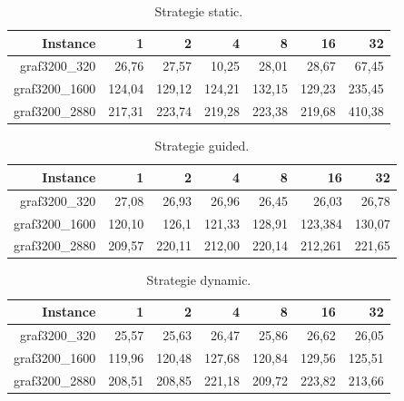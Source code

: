 \documentclass[a4paper,11pt]{article}
\begin{document}
\begin{table}[H]
  \begin{center}
      \begin{tabular}{|r|r|r|r|r|r|r|}
      \hline
      
      Instance  	& 1	    & 2		& 4	& 8	& 16 	& 32	   \\ \hline
      graf3200\_320	& 26,76 & 27,57 & 10,25	&28,01 	&28,67 	&67,45 \\ \hline
      graf3200\_1600	& 124,04 & 129,12 & 124,21 & 132,15 & 129,23 &235,45 \\ \hline
       graf3200\_2880	& 217,31 & 223,74 & 219,28 & 223,38 & 219,68 & 410,38 \\ \hline

      \end{tabular}
  \caption{Strategie static.}
  \label{tab:static}
  \end{center}
\end{table}

\begin{table}[H]
  \begin{center}
      \begin{tabular}{|r|r|r|r|r|r|r|}
      \hline
      
      Instance  	& 1	    & 2		& 4	& 8	& 16 	& 32	   \\ \hline
      graf3200\_320	& 27,08 & 26,93 & 26,96 & 26,45 & 26,03 & 26,78 \\ \hline
      graf3200\_1600	& 120,10 & 126,1 & 121,33 & 128,91 & 123,384 & 130,07 \\ \hline
      graf3200\_2880	& 209,57 & 220,11 & 212,00 & 220,14 & 212,261 & 221,65 \\ \hline
      
      \end{tabular}
  \caption{Strategie guided.}
  \label{tab:guided}
  \end{center}
\end{table}

\begin{table}[H]
  \begin{center}
      \begin{tabular}{|r|r|r|r|r|r|r|}
      \hline
      
      Instance  	& 1	    & 2		& 4	& 8	& 16 	& 32	   \\ \hline
      graf3200\_320	& 25,57 & 25,63 & 26,47 & 25,86 & 26,62 & 26,05 \\ \hline
      graf3200\_1600	& 119,96 & 120,48 & 127,68 & 120,84 & 129,56 & 125,51\\ \hline
      graf3200\_2880	& 208,51 & 208,85 & 221,18 & 209,72 & 223,82 & 213,66 \\ \hline
      
      \end{tabular}
  \caption{Strategie dynamic.}
  \label{tab:dynamic}
  \end{center}
\end{table}
\end{document}
